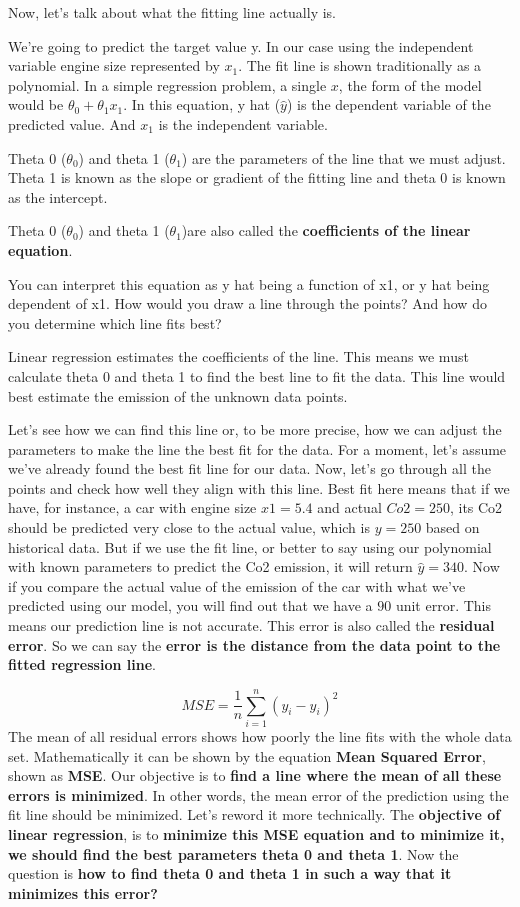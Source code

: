 	Now, let's talk about what the fitting line actually is.
	
	We're going to predict the target value y. In our case using the independent variable engine size represented by $x_{1}$. The fit line is shown traditionally as a polynomial. In a simple regression problem, a single $x$, the form of the model would be $\theta_{0} + \theta_{1}x_{1}$. In this equation, y hat ($\hat{y}$) is the dependent variable of the predicted value. And $x_{1}$ is the independent variable.
	
	Theta 0 ($\theta_{0}$) and theta 1 ($\theta_{1}$) are the parameters of the line that we must adjust. Theta 1 is known as the slope or gradient of the fitting line and theta 0 is known as the intercept.
	
	Theta 0 ($\theta_{0}$) and theta 1 ($\theta_{1}$)are also called the \textbf{coefficients of the linear equation}.
	
	You can interpret this equation as y hat being a function of x1, or y hat being dependent of x1. How would you draw a line through the points? And how do you determine which line fits best?
	
	Linear regression estimates the coefficients of the line. This means we must calculate theta 0 and theta 1 to find the best line to fit the data. This line would best estimate the emission of the unknown data points. 
	
	Let's see how we can find this line or, to be more precise, how we can adjust the parameters to make the line the best fit for the data. For a moment, let's assume we've already found the best fit line for our data. Now, let's go through all the points and check how well they align with this line. Best fit here means that if we have, for instance, a car with engine size $x1 = 5.4$ and actual $Co2 = 250$, its Co2 should be predicted very close to the actual value, which is $y = 250$ based on historical data. But if we use the fit line, or better to say using our polynomial with known parameters to predict the Co2 emission, it will return $\hat{y}= 340$. Now if you compare the actual value of the emission of the car with what we've predicted using our model, you will find out that we have a $90$ unit error. This means our prediction line is not accurate. This error is also called the \textbf{residual error}. So we can say the \textbf{error is the distance from the data point to the fitted regression line}.
	
	\begin{equation}
		MSE = \frac{1}{n} \sum_{i=1}^{n}(y_i - \hat{y}_i)^{2}
	\end{equation}
	The mean of all residual errors shows how poorly the line fits with the whole data set. Mathematically it can be shown by the equation \textbf{Mean Squared Error}, shown as \textbf{MSE}. Our objective is to \textbf{find a line where the mean of all these errors is minimized}. In other words, the mean error of the prediction using the fit line should be minimized. Let's reword it more technically. The \textbf{objective of linear regression}, is to \textbf{minimize this MSE equation and to minimize it, we should find the best parameters theta 0 and theta 1}. Now the question is \textbf{how to find theta 0 and theta 1 in such a way that it minimizes this error?}
	
